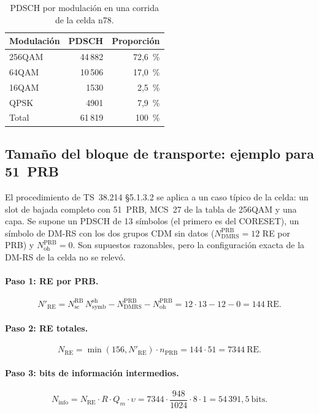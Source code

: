 \begin{table}[htbp]
\centering
\caption{PDSCH por modulación en una corrida de la celda n78.}
\label{tab:modulaciones}
\begin{tabular}{lrr}
\toprule
Modulación & PDSCH & Proporción \\
\midrule
256QAM & 44\,882 & 72,6~\% \\
64QAM & 10\,506 & 17,0~\% \\
16QAM & 1530 & 2,5~\% \\
QPSK & 4901 & 7,9~\% \\
\midrule
Total & 61\,819 & 100~\% \\
\bottomrule
\end{tabular}
\end{table}

\subsection{Tamaño del bloque de transporte: ejemplo para 51~PRB}\label{sec:tbs}
El procedimiento de TS~38.214 §5.1.3.2 se aplica a un caso típico de la celda: un slot de bajada completo con 51~PRB, MCS~27 de la tabla de 256QAM y una capa. Se supone un PDSCH de 13 símbolos (el primero es del CORESET), un símbolo de DM-RS con los dos grupos CDM sin datos ($N_\text{DMRS}^\text{PRB}=12$ RE por PRB) y $N_\text{oh}^\text{PRB}=0$. Son supuestos razonables, pero la configuración exacta de la DM-RS de la celda no se relevó.

\paragraph{Paso 1: RE por PRB.}
\begin{equation}
N'_\text{RE} = N_\text{sc}^\text{RB}\, N_\text{symb}^\text{sh} - N_\text{DMRS}^\text{PRB} - N_\text{oh}^\text{PRB} = 12\cdot 13 - 12 - 0 = 144~\text{RE}.
\end{equation}
\paragraph{Paso 2: RE totales.}
\begin{equation}
N_\text{RE} = \min(156, N'_\text{RE})\cdot n_\text{PRB} = 144\cdot 51 = 7344~\text{RE}.
\end{equation}
\paragraph{Paso 3: bits de información intermedios.}
\begin{equation}
N_\text{info} = N_\text{RE}\cdot R\cdot Q_m\cdot \upsilon = 7344\cdot \frac{948}{1024}\cdot 8\cdot 1 = 54\,391{,}5~\text{bits}.
\end{equation}
